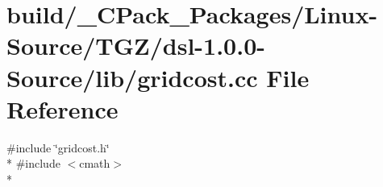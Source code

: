 \section{build/\-\_\-\-C\-Pack\-\_\-\-Packages/\-Linux-\/\-Source/\-T\-G\-Z/dsl-\/1.0.0-\/\-Source/lib/gridcost.cc File Reference}
\label{build_2__CPack__Packages_2Linux-Source_2TGZ_2dsl-1_80_80-Source_2lib_2gridcost_8cc}
{\ttfamily \#include \char`\"{}gridcost.\-h\char`\"{}}\\*
{\ttfamily \#include $<$cmath$>$}\\*
